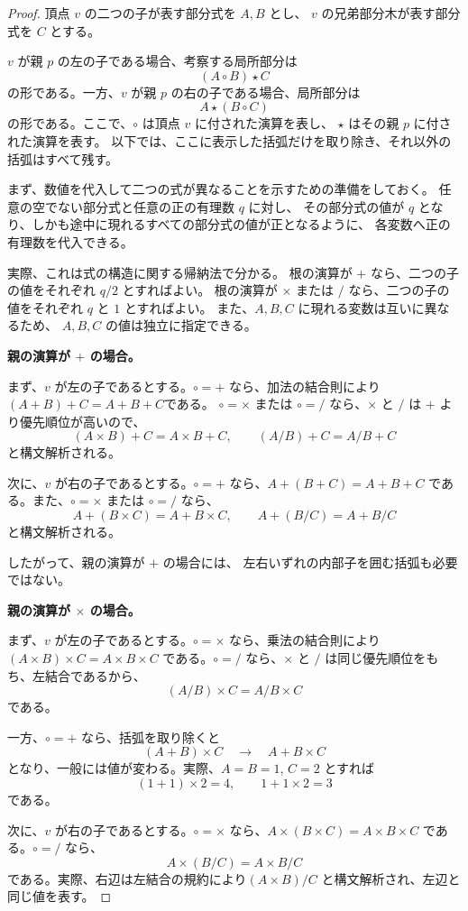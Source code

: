 \documentclass[11pt]{ltjsarticle}
\begin{document}
\begin{proof}
頂点 $v$ の二つの子が表す部分式を $A,B$ とし、
$v$ の兄弟部分木が表す部分式を $C$ とする。

$v$ が親 $p$ の左の子である場合、考察する局所部分は
\[
(A\circ B)\star C
\]
の形である。一方、$v$ が親 $p$ の右の子である場合、局所部分は
\[
A\star(B\circ C)
\]
の形である。ここで、$\circ$ は頂点 $v$ に付された演算を表し、
$\star$ はその親 $p$ に付された演算を表す。
以下では、ここに表示した括弧だけを取り除き、それ以外の括弧はすべて残す。

まず、数値を代入して二つの式が異なることを示すための準備をしておく。
任意の空でない部分式と任意の正の有理数 $q$ に対し、
その部分式の値が $q$ となり、しかも途中に現れるすべての部分式の値が正となるように、
各変数へ正の有理数を代入できる。

実際、これは式の構造に関する帰納法で分かる。
根の演算が $+$ なら、二つの子の値をそれぞれ $q/2$ とすればよい。
根の演算が $\times$ または $/$ なら、二つの子の値をそれぞれ $q$ と $1$ とすればよい。
また、$A,B,C$ に現れる変数は互いに異なるため、
$A,B,C$ の値は独立に指定できる。

\medskip
\noindent
\textbf{親の演算が $+$ の場合。}

まず、$v$ が左の子であるとする。$\circ=+$ なら、加法の結合則により$(A+B)+C=A+B+C$である。
$\circ=\times$ または $\circ=/$ なら、$\times$ と $/$ は $+$ より優先順位が高いので、
\[
(A\times B)+C=A\times B+C,
\qquad
(A/B)+C=A/B+C
\]
と構文解析される。

次に、$v$ が右の子であるとする。$\circ=+$ なら、$A+(B+C)=A+B+C$
である。また、$\circ=\times$ または $\circ=/$ なら、
\[
A+(B\times C)=A+B\times C,
\qquad
A+(B/C)=A+B/C
\]
と構文解析される。

したがって、親の演算が $+$ の場合には、
左右いずれの内部子を囲む括弧も必要ではない。

\medskip
\noindent
\textbf{親の演算が $\times$ の場合。}

まず、$v$ が左の子であるとする。$\circ=\times$ なら、乗法の結合則により$(A\times B)\times C=A\times B\times C$
である。$\circ=/$ なら、$\times$ と $/$ は同じ優先順位をもち、左結合であるから、
\[
(A/B)\times C=A/B\times C
\]
である。

一方、$\circ=+$ なら、括弧を取り除くと
\[
(A+B)\times C
\quad\longrightarrow\quad
A+B\times C
\]
となり、一般には値が変わる。実際、$A=B=1$, $C=2$ とすれば
\[
(1+1)\times2=4,
\qquad
1+1\times2=3
\]
である。

次に、$v$ が右の子であるとする。$\circ=\times$ なら、$A\times(B\times C)=A\times B\times C$
である。$\circ=/$ なら、
\[
A\times(B/C)=A\times B/C
\]
である。実際、右辺は左結合の規約により$(A\times B)/C$
と構文解析され、左辺と同じ値を表す。


\end{proof}
\end{document}
